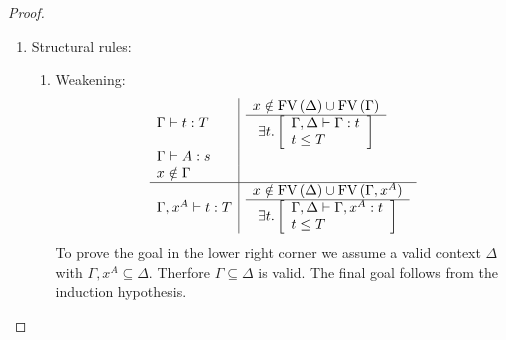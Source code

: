\begin{lemma}
\begin{proof}
{\begin{enumerate}
\begin{enumerate}
                \item Application:
                $$
                \begin{array}{l|l}
                    \Gamma \vdash f: \Pi x^A.B
                    &
                    \goal \Delta \Gamma f {\Pi x^A.B}
                    \\
                    \Gamma \vdash a: A
                    &
                    \goal \Delta \Gamma a A
                    \\
                    \hline
                    \Gamma \vdash f a : B[x:=a]
                    &
                    \goal \Delta \Gamma {f a} {B[x:=a]}
                \end{array}
                $$
                The goal in the lower right corner is an immediate consequence
                of the induction hypotheses.
            \end{enumerate}

            \item Structural rules:
            \begin{enumerate}
                \item Weakening:
                $$
                \begin{array}{l|l}
                    \Gamma \vdash t : T
                    &
                    \begin{array}{c}  x \notin \text{FV}\, (\Delta) \cup \text{FV}\, (\Gamma)  \\ \hline  \exists t. \left[ \begin{array}{l} \Gamma,\Delta \vdash \Gamma : t \\ t \le T \end{array} \right] \end{array}
                    \\
                    \Gamma \vdash A : s
                    \\
                    x \notin \Gamma
                    \\
                    \hline
                    \Gamma,x^A \vdash t: T
                    &
                    \begin{array}{c}  x \notin \text{FV}\, (\Delta) \cup \text{FV}\, (\Gamma,x^A)  \\ \hline  \exists t. \left[ \begin{array}{l} \Gamma,\Delta \vdash \Gamma,x^A : t \\ t \le T \end{array} \right] \end{array}
                \end{array}
                $$
                To prove the goal in the lower right corner we assume a valid
                    context $\Delta$ with $\Gamma,x^A \subseteq \Delta$.
                    Therfore $\Gamma \subseteq \Delta$ is valid. The final goal
                    follows from the induction hypothesis.


\end{enumerate}
\end{enumerate}}
\end{proof}
\end{lemma}
